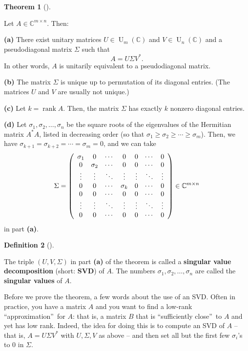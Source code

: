\documentclass[numbers=enddot,12pt,final,onecolumn,notitlepage]{scrartcl}%
\numberwithin{exer}{subsection}
\theoremstyle{definition}
\newtheorem{theo}{Theorem}[subsection]
\newenvironment{theorem}[1][]
{\begin{theo}[#1]\begin{leftbar}}
{\end{leftbar}\end{theo}}
\newtheorem{defi}[theo]{Definition}
\newenvironment{definition}[1][]
{\begin{defi}[#1]\begin{leftbar}}
{\end{leftbar}\end{defi}}
\begin{document}
\begin{theorem}
[SVD]Let $A\in\mathbb{C}^{m\times n}$. Then:

\textbf{(a)} There exist unitary matrices $U\in\operatorname*{U}%
\nolimits_{m}\left(  \mathbb{C}\right)  $ and $V\in\operatorname*{U}%
\nolimits_{n}\left(  \mathbb{C}\right)  $ and a pseudodiagonal matrix $\Sigma$
such that%
\[
A=U\Sigma V^{\ast}.
\]
In other words, $A$ is unitarily equivalent to a pseudodiagonal matrix.

\textbf{(b)} The matrix $\Sigma$ is unique up to permutation of its diagonal
entries. (The matrices $U$ and $V$ are usually not unique.)

\textbf{(c)} Let $k=\operatorname*{rank}A$. Then, the matrix $\Sigma$ has
exactly $k$ nonzero diagonal entries.

\textbf{(d)} Let $\sigma_{1},\sigma_{2},\ldots,\sigma_{n}$ be the square roots
of the eigenvalues of the Hermitian matrix $A^{\ast}A$, listed in decreasing
order (so that $\sigma_{1}\geq\sigma_{2}\geq\cdots\geq\sigma_{m}$). Then, we
have $\sigma_{k+1}=\sigma_{k+2}=\cdots=\sigma_{m}=0$, and we can take
\[
\Sigma=\left(
\begin{array}
[c]{ccccccc}%
\sigma_{1} & 0 & \cdots & 0 & 0 & \cdots & 0\\
0 & \sigma_{2} & \cdots & 0 & 0 & \cdots & 0\\
\vdots & \vdots & \ddots & \vdots & \vdots & \ddots & \vdots\\
0 & 0 & \cdots & \sigma_{k} & 0 & \cdots & 0\\
0 & 0 & \cdots & 0 & 0 & \cdots & 0\\
\vdots & \vdots & \ddots & \vdots & \vdots & \ddots & \vdots\\
0 & 0 & \cdots & 0 & 0 & \cdots & 0
\end{array}
\right)  \in\mathbb{C}^{m\times n}%
\]
in part \textbf{(a)}.
\end{theorem}

\begin{definition}
The triple $\left(  U,V,\Sigma\right)  $ in part \textbf{(a)} of the theorem
is called a \textbf{singular value decomposition} (short: \textbf{SVD}) of
$A$. The numbers $\sigma_{1},\sigma_{2},\ldots,\sigma_{n}$ are called the
\textbf{singular values} of $A$.
\end{definition}

Before we prove the theorem, a few words about the use of an SVD. Often in
practice, you have a matrix $A$ and you want to find a low-rank
\textquotedblleft approximation\textquotedblright\ for $A$: that is, a matrix
$B$ that is \textquotedblleft sufficiently close\textquotedblright\ to $A$ and
yet has low rank. Indeed, the idea for doing this is to compute an SVD of $A$
-- that is, $A=U\Sigma V^{\ast}$ with $U,\Sigma,V$ as above -- and then set
all but the first few $\sigma_{i}$'s to $0$ in $\Sigma$.
\end{document}
